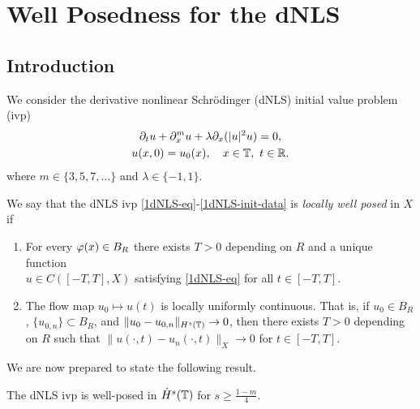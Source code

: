\chapter{Well Posedness for the dNLS}
%
%
\section{Introduction}
We consider the derivative nonlinear Schr{\"o}dinger (dNLS) initial value problem (ivp)
%
%
\begin{gather}
	\label{1dNLS-eq}
	\partial_t u + \partial_x^{m} u + \lambda \partial_x (|u|^2 u) = 0,
	\\
	\label{1dNLS-init-data}
	u(x,0) = u_0(x), \quad x \in \mathbb{T}, \ t \in \mathbb{R}.
\end{gather}
%
%
where $m \in \{3, 5, 7,\dots \}$ and $\lambda \in \{-1, 1\}$.
%
%
\begin{definition}
	We say that the dNLS ivp \eqref{1dNLS-eq}-\eqref{1dNLS-init-data} is
	\emph{locally well posed} in
	$X$ if 
	\begin{enumerate}
		\item For every $\varphi(x) \in
	B_R$ there exists $T>0$ depending on $R$ and a unique function
	\\
	$u \in C([-T, T],
	X)$ satisfying \eqref{1dNLS-eq} for all $t \in [-T, T]$. 
\item The flow map $u_0 \mapsto u(t)$ is locally uniformly continuous. That is, if $u_0
	\in B_R$, $\{u_{0,n}\} \subset B_R$, and 
	$\|u_0 - u_{0, n} \|_{H^{s}(\mathbb{T})} \to 0$, then there exists $T >0$ depending
	on $R$ such that $\|u(\cdot, t) - u_{n}(\cdot,t) \|_{X} \to
	0$ for $t \in [-T, T]$. 
	\end{enumerate}
\end{definition}
%
%
We are now prepared to state the following result.
%
%
%
%
%
%
%
\begin{theorem}
	\label{1thm:prim}
	The dNLS ivp is well-posed in $\dot{H}^s(\mathbb{T})$ for $s \ge \frac{1-m}{4}$.  
\end{theorem}
%
%
%
%
%
%
%
%
